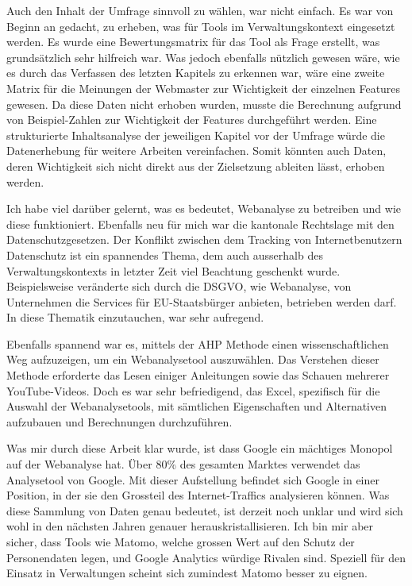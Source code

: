 Auch den Inhalt der Umfrage sinnvoll zu wählen, war nicht einfach. Es war von Beginn an gedacht, zu erheben, was für Tools im Verwaltungskontext eingesetzt werden. Es wurde eine Bewertungsmatrix für das Tool als Frage erstellt, was grundsätzlich sehr hilfreich war. Was jedoch ebenfalls nützlich gewesen wäre, wie es durch das Verfassen des letzten Kapitels zu erkennen war, wäre eine zweite Matrix für die Meinungen der Webmaster zur Wichtigkeit der einzelnen Features gewesen. Da diese Daten nicht erhoben wurden, musste die Berechnung aufgrund von Beispiel-Zahlen zur Wichtigkeit der Features durchgeführt werden. Eine strukturierte Inhaltsanalyse der jeweiligen Kapitel vor der Umfrage würde die Datenerhebung für weitere Arbeiten vereinfachen. Somit könnten auch Daten, deren Wichtigkeit sich nicht direkt aus der Zielsetzung ableiten lässt, erhoben werden.

Ich habe viel darüber gelernt, was es bedeutet, Webanalyse zu betreiben und wie diese funktioniert. Ebenfalls neu für mich war die kantonale Rechtslage mit den Datenschutzgesetzen. Der Konflikt zwischen dem Tracking von Internetbenutzern Datenschutz ist ein spannendes Thema, dem auch ausserhalb des Verwaltungskontexts in letzter Zeit viel Beachtung geschenkt wurde. Beispielsweise veränderte sich durch die DSGVO, wie Webanalyse, von Unternehmen die Services für EU-Staatsbürger anbieten, betrieben werden darf. In diese Thematik einzutauchen, war sehr aufregend. 

Ebenfalls spannend war es, mittels der AHP Methode einen wissenschaftlichen Weg aufzuzeigen, um ein Webanalysetool auszuwählen. Das Verstehen dieser Methode erforderte das Lesen einiger Anleitungen sowie das Schauen mehrerer YouTube-Videos. Doch es war sehr befriedigend, das Excel, spezifisch für die Auswahl der Webanalysetools, mit sämtlichen Eigenschaften und Alternativen aufzubauen und Berechnungen durchzuführen.

Was mir durch diese Arbeit klar wurde, ist dass Google ein mächtiges Monopol auf der Webanalyse hat. Über 80\% des gesamten Marktes verwendet das Analysetool von Google. Mit dieser Aufstellung befindet sich Google in einer Position, in der sie den Grossteil des Internet-Traffics analysieren können. Was diese Sammlung von Daten genau bedeutet, ist derzeit noch unklar und wird sich wohl in den nächsten Jahren genauer herauskristallisieren. Ich bin mir aber sicher, dass Tools wie Matomo, welche grossen Wert auf den Schutz der Personendaten legen, und Google Analytics würdige Rivalen sind. Speziell für den Einsatz in Verwaltungen scheint sich zumindest Matomo besser zu eignen.

